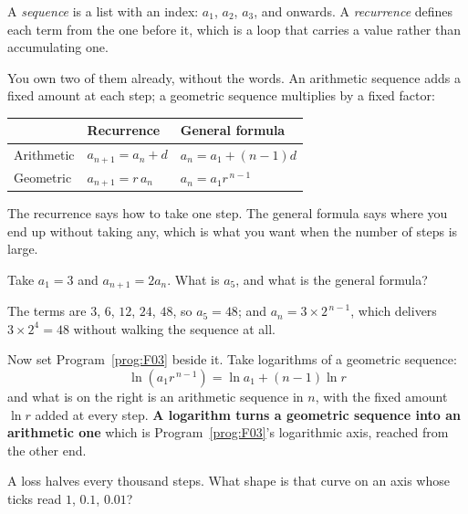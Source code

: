 \begin{fr}
A \emph{sequence} is a list with an index: $a_1$, $a_2$, $a_3$, and onwards. A
\emph{recurrence} defines each term from the one before it, which is a loop
that carries a value rather than accumulating one.

You own two of them already, without the words. An arithmetic sequence adds a
fixed amount at each step; a geometric sequence multiplies by a fixed factor:

\begin{center}
\begin{tabular}{lll}
\toprule
 & Recurrence & General formula \\
\midrule
Arithmetic & $a_{n+1} = a_n + d$ & $a_n = a_1 + (n-1)d$ \\
Geometric & $a_{n+1} = r\,a_n$ & $a_n = a_1 r^{\,n-1}$ \\
\bottomrule
\end{tabular}
\end{center}

The recurrence says how to take one step. The general formula says where you
end up without taking any, which is what you want when the number of steps is
large.

Take $a_1 = 3$ and $a_{n+1} = 2 a_n$. What is $a_5$, and what is the general
formula?
\nextframe
\end{fr}

\begin{fr}
\begin{ansblock}
The terms are $3$, $6$, $12$, $24$, $48$, so $a_5 = 48$; and
$a_n = 3 \times 2^{\,n-1}$, which delivers $3 \times 2^{4} = 48$ without
walking the sequence at all.
\end{ansblock}

Now set Program~\ref{prog:F03} beside it. Take logarithms of a geometric
sequence:
\[ \ln\!\left(a_1 r^{\,n-1}\right) = \ln a_1 + (n-1)\ln r \]
and what is on the right is an arithmetic sequence in $n$, with the fixed
amount $\ln r$ added at every step. \textbf{A logarithm turns a geometric
sequence into an arithmetic one} \dash{} which is Program~\ref{prog:F03}'s
logarithmic axis, reached from the other end.

A loss halves every thousand steps. What shape is that curve on an axis whose
ticks read $1$, $\num{0.1}$, $\num{0.01}$?
\nextframe
\end{fr}

